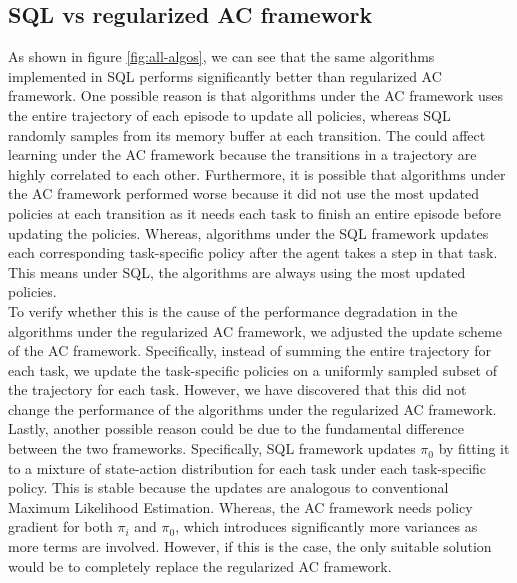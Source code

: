 \documentclass[12pt]{report}
\begin{document}
\subsection{SQL vs regularized AC framework}

As shown in figure \ref{fig:all-algos}, we can see that the same algorithms implemented in SQL performs significantly better than regularized AC framework. One possible reason is that algorithms under the AC framework uses the entire trajectory of each episode to update all policies, whereas SQL randomly samples from its memory buffer at each transition. The could affect learning under the AC framework because the transitions in a trajectory are highly correlated to each other. Furthermore, it is possible that algorithms under the AC framework performed worse because it did not use the most updated policies at each transition as it needs each task to finish an entire episode before updating the policies. Whereas, algorithms under the SQL framework updates each corresponding task-specific policy after the agent takes a step in that task. This means under SQL, the algorithms are always using the most updated policies.\\

To verify whether this is the cause of the performance degradation in the algorithms under the regularized AC framework, we adjusted the update scheme of the AC framework. Specifically, instead of summing the entire trajectory for each task, we update the task-specific policies on a uniformly sampled subset of the trajectory for each task. However, we have discovered that this did not change the performance of the algorithms under the regularized AC framework. \\

Lastly, another possible reason could be due to the fundamental difference between the two frameworks. Specifically, SQL framework updates $\pi_0$ by fitting it to a mixture of state-action distribution for each task under each task-specific policy. This is stable because the updates are analogous to conventional Maximum Likelihood Estimation. Whereas, the AC framework needs policy gradient for both $\pi_i$ and $\pi_0$, which introduces significantly more variances as more terms are involved. However, if this is the case, the only suitable solution would be to completely replace the regularized AC framework.

\end{document}
